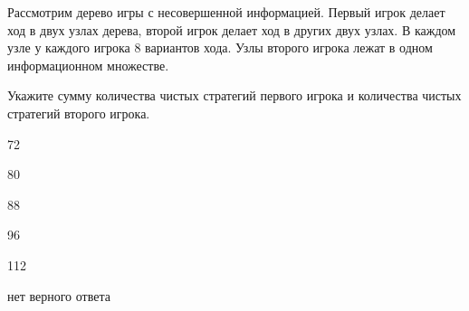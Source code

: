 
\begin{question}
Рассмотрим дерево игры с несовершенной информацией. Первый игрок делает
ход в двух узлах дерева, второй игрок делает ход в других двух узлах. В
каждом узле у каждого игрока 8 вариантов хода. Узлы второго игрока лежат
в одном информационном множестве.

Укажите сумму количества чистых стратегий первого игрока и количества
чистых стратегий второго игрока.
\begin{answerlist}
  \item 72
  \item 80
  \item 88
  \item 96
  \item 112
  \item нет верного ответа
\end{answerlist}
\end{question}


